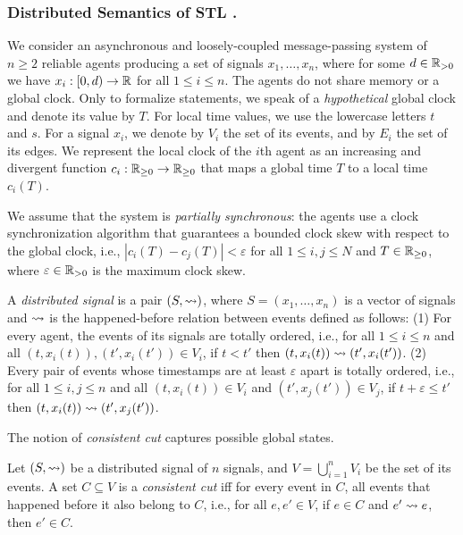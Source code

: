 \subsubsection{Distributed Semantics of STL \cite{MomtazAB23}.}
We consider an asynchronous and loosely-coupled message-passing system of $n \geq 2$ reliable agents producing a set of signals $x_1, \ldots, x_n$, where for some $d \in \mathbb{R}_{> 0}$ we have $x_i : [0,d) \to \mathbb{R}$ for all $1 \leq i \leq n$.
%
The agents do not share memory or a global clock.
%
Only to formalize statements, we speak of a \emph{hypothetical} global clock and denote its value by $T$.
%
For local time values, we use the lowercase letters $t$ and $s$.
For a signal $x_i$, we denote by $V_i$ the set of its events, and by $E_i$ the set of its edges.
%
We represent the local clock of the $i$th agent as an increasing and divergent function $c_i : 
\mathbb{R}_{\geq 0} \to \mathbb{R}_{\geq 0}$ that maps a global time $T$ to a local time $c_i(T)$.

We assume that the system is \emph{partially synchronous}: the agents use a clock synchronization algorithm that guarantees a bounded clock skew with respect to the global clock, i.e., $|c_i(T) - c_j(T)| < \varepsilon$ for all $1 \leq i,j \leq N$ and $T \in \mathbb{R}_{\geq 0}$, where $\varepsilon \in \mathbb{R}_{> 0}$ is the maximum clock skew.

\begin{definition} \label{defn:hb}
	A \emph{distributed signal} is a pair $(S, {\rightsquigarrow})$, where $S = (x_1, \ldots, x_n)$ is a vector of 
	signals and ${\rightsquigarrow}$ is the happened-before relation between events defined as follows:
	(1) For every agent, the events of its signals are totally ordered, i.e., for all $1 \leq i \leq n$ and all $(t, x_i(t)), (t', x_i(t')) \in V_i$, if $t < t'$ then $(t, x_i(t)) \rightsquigarrow (t', x_i(t'))$.
	(2) Every pair of events whose timestamps are at least $\varepsilon$ apart is totally ordered, i.e., for all $1 \leq i,j \leq n$ and all $(t, x_i(t)) \in V_i$ and $(t', x_j(t')) \in V_j$, if $t + \varepsilon \leq t'$ then $(t, x_i(t)) \rightsquigarrow (t', x_j(t'))$.
\end{definition}

The notion of \emph{consistent cut} captures possible global states.

\begin{definition}
	Let $(S, {\rightsquigarrow})$ be a distributed signal of $n$ signals, and $V = \bigcup_{i = 1}^{n} V_i$ be the set of its events.
	A set $C \subseteq V$ is a \emph{consistent cut} iff for every event in $C$, all events that happened before  it also belong to $C$, i.e., for all $e, e' \in V$, if $e \in C$ and $e' \rightsquigarrow e$, then $e' \in C$.
\end{definition}

